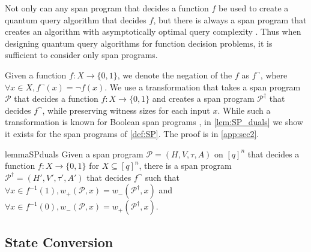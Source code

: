 \documentclass[cleveref, autoref, thm-restate,11pt]{article}
\theoremstyle{definition}
\newcommand{\sop}[1]{{\mathcal #1}}
\renewcommand{\wp}[2]{{w_+({#1},{#2})}}
\newcommand{\wm}[2]{{w_-({#1},{#2})}}
\begin{document}
Not only can any span program that decides a function $f$ be used to create a
quantum query algorithm that decides $f$, but there is always a span program
that creates an algorithm with asymptotically optimal query complexity
\cite{reichardtSpanProgramsQuantum2009,reichardtReflectionsQuantumQuery2011}.
Thus when designing quantum query algorithms for function decision problems,
it is sufficient to consider only span programs.



Given a function $f:X\rightarrow\{0,1\}$, we denote the negation of the $f$ as $f^\neg$, where $\forall x\in X, f^{\neg}(x)=\neg f(x)$.
We use a transformation that takes a span program
$\sop P$ that decides a function $f:X\rightarrow\{0,1\}$ and creates a span program $\sop P^\dagger$ that decides
$f^{\neg}$,
while preserving witness sizes for each input $x$. While such a transformation is known for Boolean span programs \cite{reichardtSpanProgramsQuantum2009}, in \cref{lem:SP_duals} we show it exists for the span programs of \cref{def:SP}. The proof is in \cref{app:sec2}.


\begin{restatable}{lemma}{SPduals}\label{lem:SP_duals}
Given a span program $\sop P=(H,V,\tau,A)$ on $[q]^n$ that decides a function
$f:X\rightarrow \{0,1\}$ for $X\subseteq [q]^n$, there is a span program
$\sop P^\dagger=(H',V',\tau',A')$ that decides $f^{\neg }$ such that  $\forall x\in f^{-1}(1), \wp{\sop P}{x}=
\wm{\sop P^\dagger}{x}$ and $\forall x\in f^{-1}(0),\wm{\sop P}{x}=
\wp{\sop P^\dagger}{x}$.
\end{restatable}










\subsection{State Conversion}\label{sec:dualAdvIntro}
\end{document}
